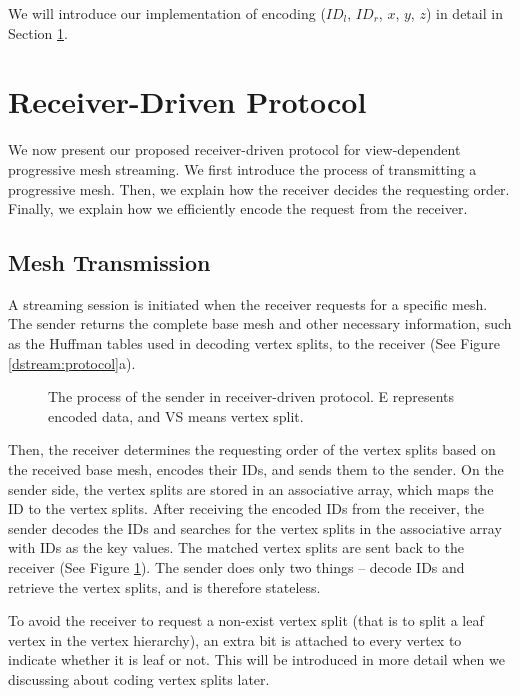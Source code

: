     We will introduce our implementation of encoding ($ID_l$, $ID_r$, $x$, $y$, $z$) 
    in detail in Section \ref{s:dstream:protocol}.

\section{Receiver-Driven Protocol}
     \label{s:dstream:protocol}
	 We now present our proposed receiver-driven protocol
     for view-dependent progressive mesh streaming.
     We first introduce the process of transmitting 
     a progressive mesh. Then, we explain how the receiver decides the requesting order.
     Finally, we explain how we efficiently encode the request from the receiver.
     
     \subsection{Mesh Transmission} 
     A streaming session is initiated when the receiver requests for a specific
     mesh.
     The sender returns the complete base mesh and other necessary information,
     such as the Huffman tables used in decoding vertex splits, to the receiver
     (See Figure \ref{dstream:protocol}a).
     
     \begin{figure}
     \centering
     \caption{The process of the sender in receiver-driven protocol. 
     E represents encoded data, and VS means vertex split. \label{dstream:process}}
     \end{figure}
     Then, the receiver determines
     the requesting order of the vertex splits based on the received base mesh, 
     encodes their IDs, and
     sends them to the sender. On the sender side, the vertex splits are stored
     in an associative array, which maps the ID to the vertex splits. 
     After receiving the encoded IDs from the receiver, 
     the sender decodes the IDs and searches for the vertex splits 
     in the associative array
     with IDs as the key values. The matched vertex splits
     are sent back to the receiver (See Figure \ref{dstream:process}). 
     The sender does only two things -- decode IDs and retrieve the 
     vertex splits, and is therefore stateless. 

     To avoid the receiver to request a non-exist vertex split (that is to split
     a leaf vertex in the vertex hierarchy),
     an extra bit is attached to every vertex to indicate whether it is leaf or not.
     This will be introduced in more detail when we discussing about coding vertex splits
     later.
     
